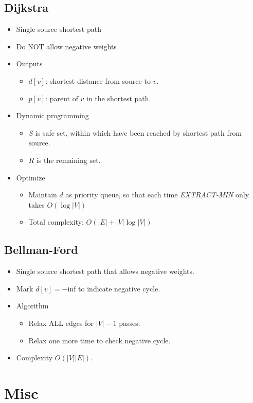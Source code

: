 \documentclass[twocolumn]{article}
\begin{document}
\subsection{Dijkstra}
\begin{itemize}
\item Single source shortest path
\item Do NOT allow negative weights
\item Outputs
  \begin{itemize}
  \item $d[v]$: shortest distance from source to $v$.
  \item $p[v]$: parent of $v$ in the shortest path.
  \end{itemize}
\item Dynamic programming
  \begin{itemize}
  \item $S$ is safe set, within which have been reached by shortest path from source.
  \item $R$ is the remaining set.
  \end{itemize}
\item Optimize
  \begin{itemize}
  \item Maintain $d$ as priority queue, so that each time \textit{EXTRACT-MIN} only takes $O(\log|V|)$
  \item Total complexity: $O(|E|+|V|\log|V|)$
  \end{itemize}
\end{itemize}


\subsection{Bellman-Ford}
\begin{itemize}
\item Single source shortest path that allows negative weights.
\item Mark $d[v]=-\text{inf}$ to indicate negative cycle.
\item Algorithm
  \begin{itemize}
  \item Relax ALL edges for $|V|-1$ passes.
  \item Relax one more time to check negative cycle.
  \end{itemize}
\item Complexity $O(|V||E|)$.
\end{itemize}


\section{Misc}


\end{document}
